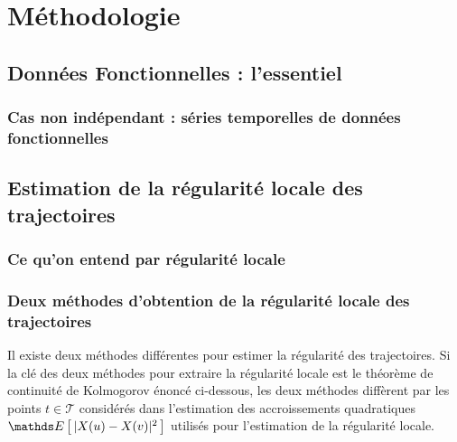 \chapter{Méthodologie}
\minitoc%

\section{Données Fonctionnelles : l'essentiel}

    

    \pagebreak
    \subsection{Cas non indépendant : séries temporelles de données fonctionnelles}
        
    

\pagebreak

\section{Estimation de la régularité locale des trajectoires}

\subsection{Ce qu'on entend par régularité locale}




\subsection{Deux méthodes d'obtention de la régularité locale des trajectoires}

Il existe deux méthodes différentes pour estimer la régularité des trajectoires. Si la clé des deux méthodes pour extraire la régularité locale est le théorème de continuité de Kolmogorov énoncé ci-dessous, les deux méthodes diffèrent par les points $t \in \mathcal T$ considérés dans l'estimation des accroissements quadratiques $\esperance{ \vert X(u) - X(v) \vert^2 }$ utilisés pour l'estimation de la régularité locale. 

